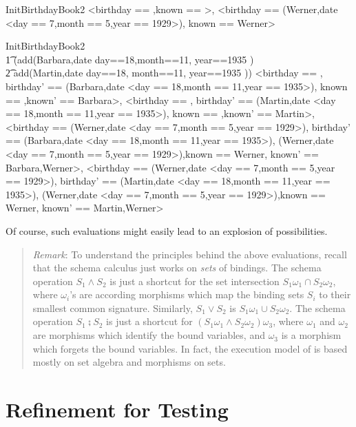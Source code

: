 \documentclass{article}
\newenvironment{remark}
{\begin{small}\begin{quote}\emph{Remark}: }{\end{quote}\end{small}}
\begin{document}
\begin{zexecexpr}
 InitBirthdayBook2
\yields
{<birthday == {},known == {}>,
 <birthday == {(Werner,date <day == 7,month == 5,year == 1929>)},
  known == {Werner}>}
\end{zexecexpr}
\begin{zexecexpr}
 InitBirthdayBook2 \\\t1
 \semi (add(Barbara,date \lbind day==18,month==11, year==1935 \rbind)\\\t2
    \lor add(Martin,date \lbind day==18, month==11, year==1935 \rbind))
\yields
{<birthday == {},
  birthday' == {(Barbara,date <day == 18,month == 11,year == 1935>)},
  known == {},known' == {Barbara}>,
 <birthday == {},
  birthday' == {(Martin,date <day == 18,month == 11,year == 1935>)},
  known == {},known' == {Martin}>,
 <birthday == {(Werner,date <day == 7,month == 5,year == 1929>)},
  birthday' ==
   {(Barbara,date <day == 18,month == 11,year == 1935>),
    (Werner,date <day == 7,month == 5,year == 1929>)},known == {Werner},
  known' == {Barbara,Werner}>,
 <birthday == {(Werner,date <day == 7,month == 5,year == 1929>)},
  birthday' ==
   {(Martin,date <day == 18,month == 11,year == 1935>),
    (Werner,date <day == 7,month == 5,year == 1929>)},known == {Werner},
  known' == {Martin,Werner}>}
\end{zexecexpr}

Of course, such evaluations might easily lead to an explosion of
possibilities. 

\begin{remark}
  To understand the principles behind the above evaluations, recall
  that the schema calculus just works on \emph{sets} of bindings. The
  schema operation $S_1 \land S_2$ is just a shortcut for the set
  intersection $S_1\omega_1 \cap S_2\omega_2$, where $\omega_i$'s are
  according morphisms which map the binding sets $S_i$ to their
  smallest common signature. Similarly, $S_1 \lor S_2$ is
  $S_1\omega_1 \cup S_2\omega_2$. The schema operation $S_1 \semi S_2$
  is just a shortcut for $(S_1\omega_1 \land S_2\omega_2)\omega_3$, where
  $\omega_1$ and $\omega_2$ are morphisms which identify the bound variables,
  and $\omega_3$ is a morphism which forgets the bound variables. In fact,
  the execution model of \ZAP{} is based mostly on set algebra
  and morphisms on sets.
\end{remark}


\section{Refinement for Testing}
\end{document}
